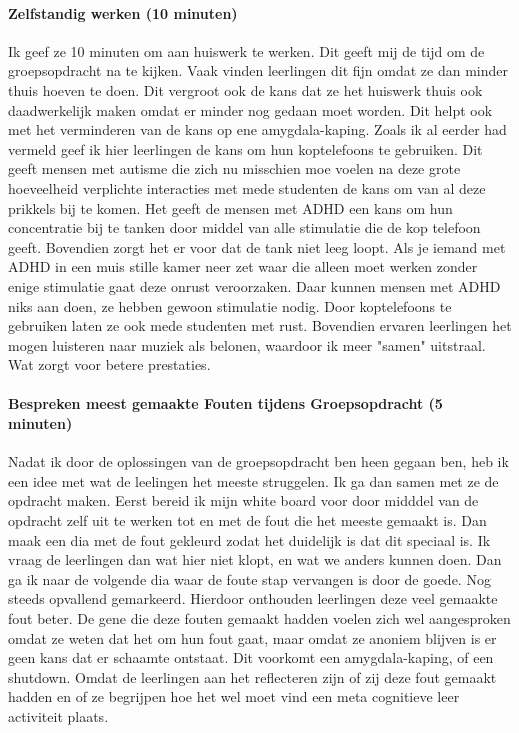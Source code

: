 \documentclass{article}
\begin{document}
                \paragraph{Zelfstandig werken (10 minuten)}
                    Ik geef ze 10 minuten om aan huiswerk te werken. Dit geeft mij de tijd om de groepsopdracht na te kijken. Vaak vinden leerlingen dit fijn omdat ze dan minder thuis hoeven te doen. Dit vergroot ook de kans dat ze het huiswerk thuis ook daadwerkelijk maken omdat er minder nog gedaan moet worden.\cite{more-homework-equals-bad} Dit helpt ook met het verminderen van de kans op ene amygdala-kaping.\cite{more-homework-equals-bad} 
                    \bigskip
                    \noindent Zoals ik al eerder had vermeld geef ik hier leerlingen de kans om hun koptelefoons te gebruiken. Dit geeft mensen met autisme die zich nu misschien moe voelen na deze grote hoeveelheid verplichte interacties met mede studenten de kans om van al deze prikkels bij te komen. Het geeft de mensen met ADHD een kans om hun concentratie bij te tanken door middel van alle stimulatie die de kop telefoon geeft. Bovendien zorgt het er voor dat de tank niet leeg loopt. Als je iemand met ADHD in een muis stille kamer neer zet waar die alleen moet werken zonder enige stimulatie gaat deze onrust veroorzaken. Daar kunnen mensen met ADHD niks aan doen, ze hebben gewoon stimulatie nodig. Door koptelefoons te gebruiken laten ze ook mede studenten met rust. Bovendien ervaren leerlingen het mogen luisteren naar muziek als belonen, waardoor ik meer "samen" uitstraal. Wat zorgt voor betere prestaties.\cite{samen-boven-leads-to-better-results}
                \paragraph{Bespreken meest gemaakte Fouten tijdens Groepsopdracht (5 minuten)}
                    Nadat ik door de oplossingen van de groepsopdracht ben heen gegaan ben, heb ik een idee met wat de leelingen het meeste struggelen. Ik ga dan samen met ze de opdracht maken. Eerst bereid ik mijn white board voor door midddel van de opdracht zelf uit te werken tot en met de fout die het meeste gemaakt is. Dan maak een dia met de fout gekleurd zodat het duidelijk is dat dit speciaal is. Ik vraag de leerlingen dan wat hier niet klopt, en wat we anders kunnen doen. Dan ga ik naar de volgende dia waar de foute stap vervangen is door de goede. Nog steeds opvallend gemarkeerd. Hierdoor onthouden leerlingen deze veel gemaakte fout beter.\cite{Visual-Learners-are-the-most-common} De gene die deze fouten gemaakt hadden voelen zich wel aangesproken omdat ze weten dat het om hun fout gaat, maar omdat ze anoniem blijven is er geen kans dat er schaamte ontstaat. Dit voorkomt een amygdala-kaping, of een shutdown.\cite{more-homework-equals-bad}\cite{autisme-shutdowns} Omdat de leerlingen aan het reflecteren zijn of zij deze fout gemaakt hadden en of ze begrijpen hoe het wel moet vind een meta cognitieve leer activiteit plaats.\cite{NAME-ME}
\end{document}
